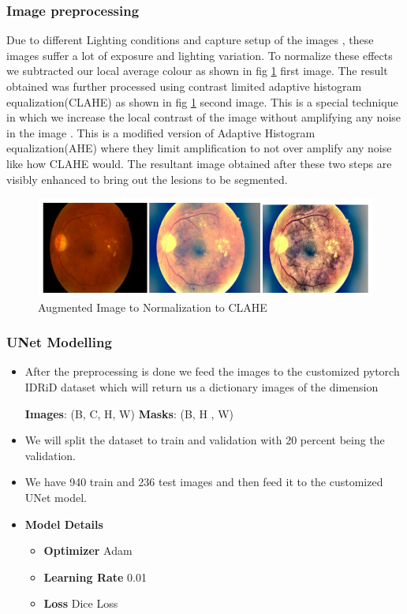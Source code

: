 \documentclass[conference]{IEEEtran}
\begin{document}
\subsubsection{Image preprocessing}
\label{sssec:preprocess}

Due to different Lighting conditions and capture setup of the images , these images suffer a lot of  exposure and lighting variation. To normalize these effects we subtracted our local average colour as shown in  fig \ref{fig:pre} first image. The result obtained was further processed using contrast limited adaptive histogram equalization(CLAHE) as shown in fig \ref{fig:pre} second image. This is a special technique in which we increase the local contrast of the image without amplifying any noise in the image . This is a modified version of Adaptive Histogram equalization(AHE) where they limit amplification to not over amplify any noise like how CLAHE would. The resultant image obtained after these two steps are visibly enhanced to bring out the lesions to be segmented.

\par              
\begin{figure}[H]
	\centering
	\includegraphics[width=\linewidth]{image/preprocess.PNG}
	\caption{Augmented Image to Normalization to CLAHE}
	\label{fig:pre}
\end{figure}

\subsubsection{UNet Modelling}
\label{sssec:model}

\begin{itemize}
\item After the preprocessing is done  we feed the images to the customized pytorch IDRiD dataset which will return us a dictionary images of the dimension \par 
		\textbf{Images}: (B, C, H, W)        \textbf{Masks}: (B, H , W)
\item We will split the dataset to train and validation with 20 percent being the validation.
\item  We have 940 train and 236 test images and then feed it to the customized UNet model.
\item \textbf{Model Details}
					\begin{itemize}
					\item \textbf{Optimizer} Adam 
					\item \textbf{Learning Rate} 0.01 
					\item \textbf{Loss} Dice Loss
					\end{itemize}
\end{itemize}
\end{document}
